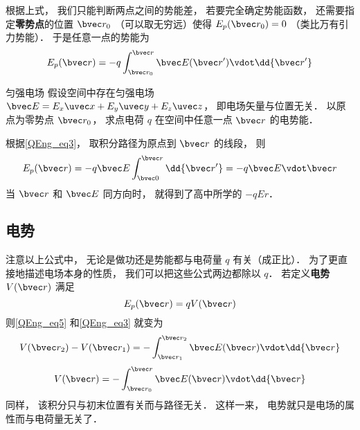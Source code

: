 根据上式， 我们只能判断两点之间的势能差， 若要完全确定势能函数， 还需要指定\textbf{零势点}的位置 $\bvec r_0$ （可以取无穷远）使得 $E_p(\bvec r_0) = 0$ （类比万有引力势能）． 于是任意一点的势能为
\begin{equation}\label{QEng_eq3}
E_p(\bvec r) = -q \int_{\bvec r_0}^{\bvec r} \bvec E(\bvec r') \vdot \dd{\bvec r'}
\end{equation}

\begin{example}{匀强电场}
假设空间中存在匀强电场 $\bvec E = E_x \uvec x + E_y \uvec y + E_z \uvec z$， 即电场矢量与位置无关． 以原点为零势点 $\bvec r_0$， 求点电荷 $q$ 在空间中任意一点 $\bvec r$ 的电势能．

根据\autoref{QEng_eq3}， 取积分路径为原点到 $\bvec r$ 的线段， 则
\begin{equation}
E_p(\bvec r) = -q \bvec E \int_{\bvec 0}^{\bvec r} \dd{\bvec r'} = -q \bvec E \vdot \bvec r
\end{equation}
当 $\bvec r$ 和 $\bvec E$ 同方向时， 就得到了高中所学的 $-qEr$．
\end{example}

\subsection{电势}
注意以上公式中， 无论是做功还是势能都与电荷量 $q$ 有关（成正比）． 为了更直接地描述电场本身的性质， 我们可以把这些公式两边都除以 $q$． 若定义\textbf{电势} $V(\bvec r)$ 满足
\begin{equation}
E_p(\bvec r) = q V(\bvec r)
\end{equation}
则\autoref{QEng_eq5} 和\autoref{QEng_eq3} 就变为
\begin{equation}\label{QEng_eq1}
V(\bvec r_2) - V(\bvec r_1) = - \int_{\bvec r_1}^{\bvec r_2} \bvec E(\bvec r) \vdot \dd{\bvec r}
\end{equation}
\begin{equation}\label{QEng_eq9}
V(\bvec r) = -\int_{\bvec r_0}^{\bvec r} \bvec E(\bvec r) \vdot \dd{\bvec r}
\end{equation}
同样， 该积分只与初末位置有关而与路径无关． 这样一来， 电势就只是电场的属性而与电荷量无关了．

